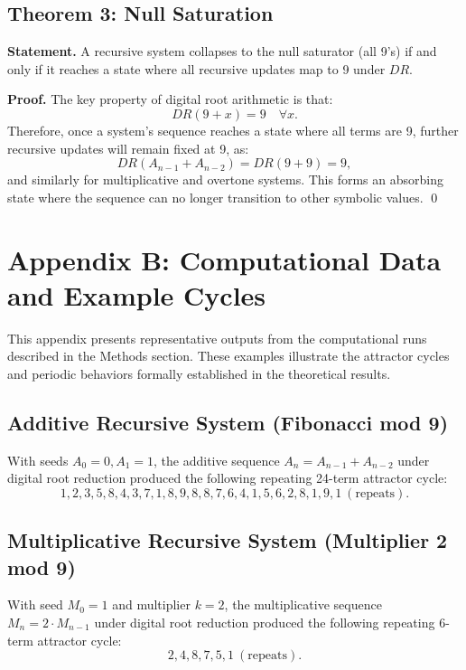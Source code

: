 \documentclass[12pt]{article}
\begin{document}
\subsection{Theorem 3: Null Saturation}

\textbf{Statement.}  
A recursive system collapses to the null saturator (all 9's) if and only if it reaches a state where all recursive updates map to 9 under \( DR \).

\textbf{Proof.}  
The key property of digital root arithmetic is that:
\[
DR(9 + x) = 9 \quad \forall x.
\]
Therefore, once a system’s sequence reaches a state where all terms are 9, further recursive updates will remain fixed at 9, as:
\[
DR(A_{n-1} + A_{n-2}) = DR(9 + 9) = 9,
\]
and similarly for multiplicative and overtone systems. This forms an absorbing state where the sequence can no longer transition to other symbolic values.  
\qed



\nextpage
\section{Appendix B: Computational Data and Example Cycles}

This appendix presents representative outputs from the computational runs described in the Methods section. These examples illustrate the attractor cycles and periodic behaviors formally established in the theoretical results.

\subsection{Additive Recursive System (Fibonacci mod 9)}

With seeds \( A_0 = 0, A_1 = 1 \), the additive sequence \( A_n = A_{n-1} + A_{n-2} \) under digital root reduction produced the following repeating 24-term attractor cycle:
\[
1, 2, 3, 5, 8, 4, 3, 7, 1, 8, 9, 8, 8, 7, 6, 4, 1, 5, 6, 2, 8, 1, 9, 1 \ (\text{repeats}).
\]

\subsection{Multiplicative Recursive System (Multiplier 2 mod 9)}

With seed \( M_0 = 1 \) and multiplier \( k = 2 \), the multiplicative sequence \( M_n = 2 \cdot M_{n-1} \) under digital root reduction produced the following repeating 6-term attractor cycle:
\[
2, 4, 8, 7, 5, 1 \ (\text{repeats}).
\]
\end{document}

